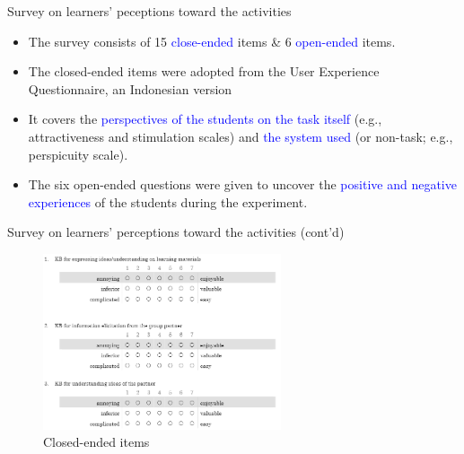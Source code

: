\begin{frame}{Survey on learners' peceptions toward the activities}
    \begin{itemize}
        \item <1-3>The survey consists of 15 \textcolor{blue}{close-ended} items \& 6 \textcolor{blue}{open-ended} items. 
        
        \item <1>The closed-ended items were adopted from the User Experience Questionnaire, an Indonesian version \cite{Santoso2016MeasuringEnvironment}
        
        \item <2>It covers the \textcolor{blue}{perspectives of the students on the task itself} (e.g., attractiveness and stimulation scales) and \textcolor{blue}{the system used} (or non-task; e.g., perspicuity scale). 
        
        \item <3>The six open-ended questions were given to uncover the \textcolor{blue}{positive and negative experiences} of the students during the experiment.
    \end{itemize}
    
\end{frame}
\begin{frame}{Survey on learners' perceptions toward the activities (cont'd)}
    \begin{figure}[tb]
        \begin{center}
            \includegraphics[width=70mm]{images/rqa_questionnaire_closed.png}
        \end{center}
        \caption{Closed-ended items}
        \label{questionnaire_close}
    \end{figure}
\end{frame}
